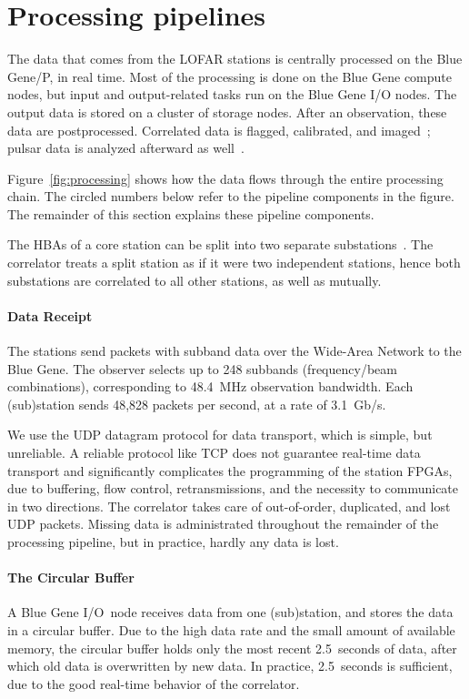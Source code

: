 \section{Processing pipelines}

The data that comes from the LOFAR stations is centrally processed on the
Blue Gene/P, in real time.
Most of the processing is done on the Blue Gene compute nodes, but input
and output-related tasks run on the Blue Gene I/O nodes.
The output data is stored on a cluster of storage nodes.
After an observation, these data are postprocessed.
Correlated data is flagged, calibrated, and imaged~\cite{Nijboer:10};
pulsar data is analyzed afterward as well~\cite{Hessels:10}.

Figure~\ref{fig:processing} shows how the data flows through the entire
processing chain.
The circled numbers below refer to the pipeline components in the figure.
The remainder of this section explains these pipeline components.

The HBAs of a core station can be split into two separate substations~\cite{?}.
The correlator treats a split station as if it were two independent stations,
hence both substations are correlated to all other stations, as well as
mutually.



\paragraph{Data Receipt }
The stations send packets with subband data over the Wide-Area Network to the
Blue Gene.
The observer selects up to 248 subbands (frequency/beam combinations),
corresponding to 48.4~MHz observation bandwidth.
Each (sub)station sends 48,828 packets per second, at a rate of 3.1~Gb/s.

We use the UDP datagram protocol for data transport, which is simple, but
unreliable.
A reliable protocol like TCP does not guarantee real-time data transport
and significantly complicates the programming of the station FPGAs, due to
buffering, flow control, retransmissions, and the necessity to communicate
in two directions.
The correlator takes care of out-of-order, duplicated, and lost UDP packets.
Missing data is administrated throughout the remainder of the processing
pipeline, but in practice, hardly any data is lost.


\paragraph{The Circular Buffer }
A Blue Gene I/O~node receives data from one (sub)station, and stores the
data in a circular buffer.
Due to the high data rate and the small amount of available memory,
the circular buffer holds only the most recent 2.5~seconds of data, after
which old data is overwritten by new data.
In practice, 2.5~seconds is sufficient, due to the good real-time behavior of
the correlator.


